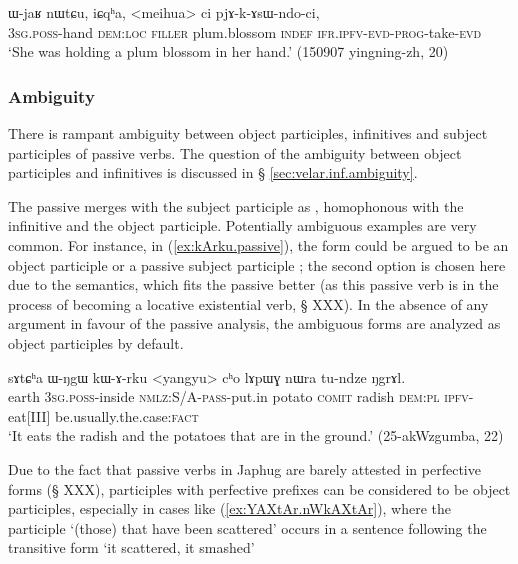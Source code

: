 \begin{exe}
\ex  \label{ex:meihua.ci.pjAkAsWndoci}
\gll   ɯ-jaʁ nɯtɕu, iɕqʰa, <meihua> ci pjɤ-k-ɤsɯ-ndo-ci, \\
\textsc{3sg}.\textsc{poss}-hand \textsc{dem}:\textsc{loc} \textsc{filler} plum.blossom \textsc{indef} \textsc{ifr}.\textsc{ipfv}-\textsc{evd}-\textsc{prog}-take-\textsc{evd} \\
 \glt `She was holding a plum blossom in her hand.' (150907 yingning-zh, 20)
\end{exe}

\subsubsection{Ambiguity} \label{sec:object.participle.ambiguity}
There is rampant ambiguity between object participles,  infinitives and subject participles of passive verbs.  The question of the ambiguity between object participles and  infinitives is discussed in § \ref{sec:velar.inf.ambiguity}.

The passive  merges with the subject participle as , homophonous with the infinitive and the object participle. Potentially ambiguous examples are very common. For instance, in (\ref{ex:kArku.passive}), the form  could be argued to be an object participle  or a passive subject participle ; the second option is chosen here due to the semantics, which fits the passive  better (as this passive verb is in the process of becoming a locative existential verb, § XXX). In the absence of any argument in favour of the passive analysis, the ambiguous  forms are analyzed as object participles by default.

\begin{exe}
\ex \label{ex:kArku.passive}
 \gll  sɤtɕʰa ɯ-ŋgɯ kɯ-ɤ-rku <yangyu> cʰo lɤpɯɣ nɯra tu-ndze ŋgrɤl. \\
 earth \textsc{3sg}.\textsc{poss}-inside \textsc{nmlz}:S/A-\textsc{pass}-put.in potato \textsc{comit} radish \textsc{dem}:\textsc{pl} \textsc{ipfv}-eat[III] be.usually.the.case:\textsc{fact} \\
 \glt `It eats the radish and the potatoes that are in the ground.' (25-akWzgumba, 22)
\end{exe}

Due to the fact that passive verbs in Japhug are barely attested in perfective forms (§ XXX), participles with perfective prefixes can be considered to be object participles, especially in cases like (\ref{ex:YAXtAr.nWkAXtAr}), where the participle   `(those) that have been scattered' occurs in a sentence following the transitive form  `it scattered, it smashed'

